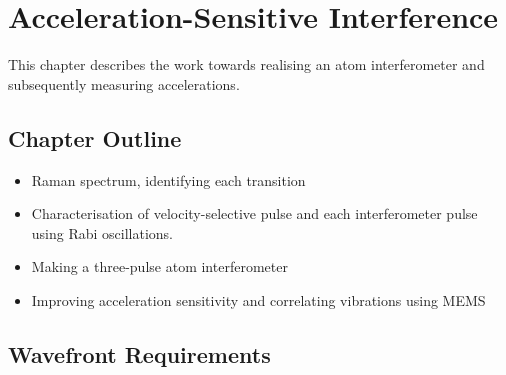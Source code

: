 \chapter{Acceleration-Sensitive Interference}\label{chap:atom_int}

This chapter describes the work towards realising an atom interferometer and
subsequently measuring accelerations.
\section{Chapter Outline}
\begin{itemize}
	\item Raman spectrum, identifying each transition
	\item Characterisation of velocity-selective pulse and each interferometer
	pulse using Rabi oscillations.
	\item Making a three-pulse atom interferometer
	\item Improving acceleration sensitivity and correlating vibrations using MEMS
\end{itemize}
\section{Wavefront Requirements}

